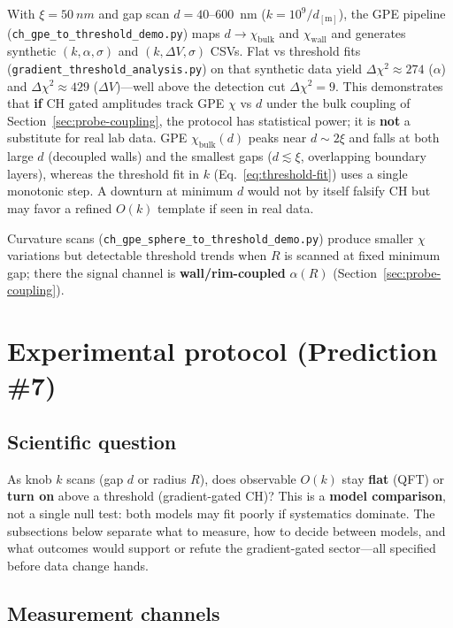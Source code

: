 \documentclass[11pt,a4paper]{article}
\newcommand{\py}[1]{\nolinkurl{#1}}
\begin{document}
With $\xi = \SI{50}{nm}$ and gap scan $d = 40$--$600$~nm ($k = 10^9/d_{[\mathrm{m}]}$), the GPE pipeline (\py{ch_gpe_to_threshold_demo.py}) maps $d \to \chi_{\mathrm{bulk}}$ and $\chi_{\mathrm{wall}}$ and generates synthetic $(k, \alpha, \sigma)$ and $(k, \Delta V, \sigma)$ CSVs.
Flat vs threshold fits (\py{gradient_threshold_analysis.py}) on that synthetic data yield $\Delta\chi^2 \approx 274$ ($\alpha$) and $\Delta\chi^2 \approx 429$ ($\Delta V$)---well above the detection cut $\Delta\chi^2 = 9$.
This demonstrates that \textbf{if} CH gated amplitudes track GPE $\chi$ vs $d$ under the bulk coupling of Section~\ref{sec:probe-coupling}, the protocol has statistical power; it is \textbf{not} a substitute for real lab data.
GPE $\chi_{\mathrm{bulk}}(d)$ peaks near $d \sim 2\xi$ and falls at both large $d$ (decoupled walls) and the smallest gaps ($d \lesssim \xi$, overlapping boundary layers), whereas the threshold fit in $k$ (Eq.~\ref{eq:threshold-fit}) uses a single monotonic step.
A downturn at minimum $d$ would not by itself falsify CH but may favor a refined $O(k)$ template if seen in real data.

Curvature scans (\texttt{ch\_gpe\_sphere\_to\_threshold\_demo.py}) produce smaller $\chi$ variations but detectable threshold trends when $R$ is scanned at fixed minimum gap; there the signal channel is \textbf{wall/rim-coupled} $\alpha(R)$ (Section~\ref{sec:probe-coupling}).

\section{Experimental protocol (Prediction \#7)}
\label{sec:protocol}

\subsection{Scientific question}

As knob $k$ scans (gap $d$ or radius $R$), does observable $O(k)$ stay \textbf{flat} (QFT) or \textbf{turn on} above a threshold (gradient-gated CH)?
This is a \textbf{model comparison}, not a single null test: both models may fit poorly if systematics dominate.
The subsections below separate what to measure, how to decide between models, and what outcomes would support or refute the gradient-gated sector---all specified before data change hands.

\subsection{Measurement channels}
\end{document}
